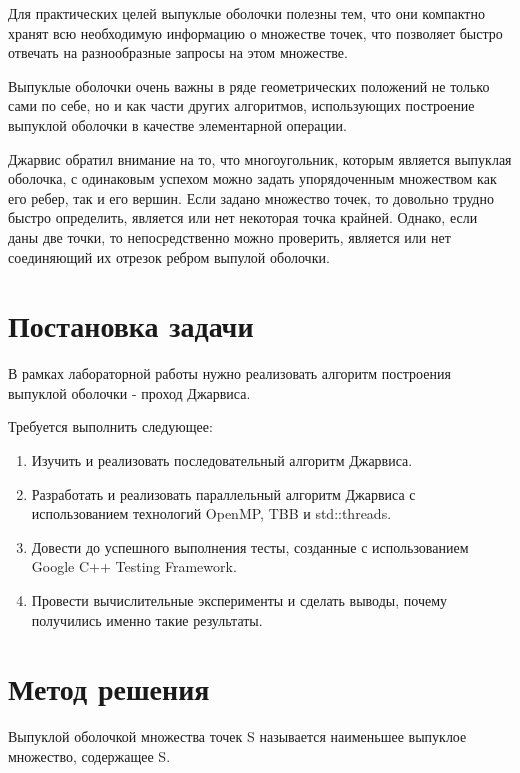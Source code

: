 \documentclass{article}
\begin{document}
\par Для практических целей выпуклые оболочки полезны тем, что они компактно хранят всю необходимую информацию о множестве точек, что позволяет быстро отвечать на разнообразные запросы на этом множестве.

\par Выпуклые оболочки очень важны в ряде геометрических положений не только сами по себе, но и как части других алгоритмов, использующих построение выпуклой оболочки в качестве элементарной операции.

\par Джарвис обратил внимание на то, что многоугольник, которым является выпуклая оболочка, с одинаковым успехом можно задать упорядоченным множеством как его ребер, так и его вершин. Если задано множество точек, то довольно трудно быстро определить, является или нет некоторая точка крайней. Однако, если даны две точки, то непосредственно можно проверить, является или нет соединяющий их отрезок ребром выпулой оболочки.

\newpage

\section{Постановка задачи}

В рамках лабораторной работы нужно реализовать алгоритм построения выпуклой оболочки - проход Джарвиса.

\par Требуется выполнить следующее:

\begin{enumerate}
\item Изучить и реализовать последовательный алгоритм Джарвиса.
\item Разработать и реализовать параллельный алгоритм Джарвиса с использованием технологий OpenMP, TBB и std::threads.
\item Довести до успешного выполнения тесты, созданные с использованием Google C++ Testing Framework.
\item Провести вычислительные эксперименты и сделать выводы, почему получились именно такие результаты.
\end{enumerate}

\newpage

\section{Метод решения}

Выпуклой оболочкой множества точек S называется наименьшее выпуклое множество, содержащее S.
\end{document}
